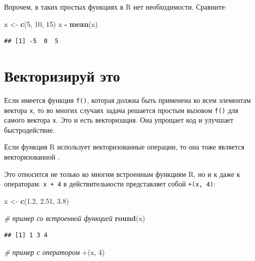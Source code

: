 \documentclass[
]{book}
\newenvironment{Shaded}{\begin{snugshade}}{\end{snugshade}}
\newcommand{\AttributeTok}[1]{\textcolor[rgb]{0.13,0.29,0.53}{#1}}
\newcommand{\CommentTok}[1]{\textcolor[rgb]{0.56,0.35,0.01}{\textit{#1}}}
\newcommand{\DecValTok}[1]{\textcolor[rgb]{0.00,0.00,0.81}{#1}}
\newcommand{\FloatTok}[1]{\textcolor[rgb]{0.00,0.00,0.81}{#1}}
\newcommand{\FunctionTok}[1]{\textcolor[rgb]{0.13,0.29,0.53}{\textbf{#1}}}
\newcommand{\NormalTok}[1]{#1}
\newcommand{\OtherTok}[1]{\textcolor[rgb]{0.56,0.35,0.01}{#1}}
\newcommand{\SpecialCharTok}[1]{\textcolor[rgb]{0.81,0.36,0.00}{\textbf{#1}}}
\newcommand{\StringTok}[1]{\textcolor[rgb]{0.31,0.60,0.02}{#1}}
\theoremstyle{definition}
\theoremstyle{definition}
\theoremstyle{definition}
\theoremstyle{definition}
\theoremstyle{remark}
\begin{document}
Впрочем, в таких простых функциях в R нет необходимости. Сравните:

\begin{Shaded}
\begin{Highlighting}[]
\NormalTok{x }\OtherTok{\textless{}{-}} \FunctionTok{c}\NormalTok{(}\DecValTok{5}\NormalTok{, }\DecValTok{10}\NormalTok{, }\DecValTok{15}\NormalTok{)}
\NormalTok{x }\SpecialCharTok{{-}} \FunctionTok{mean}\NormalTok{(x)}
\end{Highlighting}
\end{Shaded}

\begin{verbatim}
## [1] -5  0  5
\end{verbatim}

\hypertarget{ux432ux435ux43aux442ux43eux440ux438ux437ux438ux440ux443ux439-ux44dux442ux43e}{%
\section{Векторизируй это}\label{ux432ux435ux43aux442ux43eux440ux438ux437ux438ux440ux443ux439-ux44dux442ux43e}}

Если имеется функция \texttt{f()}, которая должна быть применена ко всем элементам вектора \texttt{x}, то во многих случаях задача решается простым вызовом \texttt{f()} для самого вектора \texttt{x}. Это и есть векторизация. Она упрощает код и улучшает быстродействие.

Если функция R использует векторизованные операции, то она тоже является векторизованной \citep{мэтлофф2019}.

Это относится не только ко многим встроенным функциям R, но и к даже к операторам. \texttt{x\ +\ 4} в действительности представляет собой \texttt{+(x,\ 4)}:

\begin{Shaded}
\begin{Highlighting}[]
\NormalTok{x }\OtherTok{\textless{}{-}} \FunctionTok{c}\NormalTok{(}\FloatTok{1.2}\NormalTok{, }\FloatTok{2.51}\NormalTok{, }\FloatTok{3.8}\NormalTok{)}

\CommentTok{\# пример со встроенной функцией}
\FunctionTok{round}\NormalTok{(x)}
\end{Highlighting}
\end{Shaded}

\begin{verbatim}
## [1] 1 3 4
\end{verbatim}

\begin{Shaded}
\begin{Highlighting}[]
\CommentTok{\# пример с оператором}
\StringTok{\textasciigrave{}}\AttributeTok{+}\StringTok{\textasciigrave{}}\NormalTok{(x, }\DecValTok{4}\NormalTok{) }
\end{Highlighting}
\end{Shaded}
\end{document}
